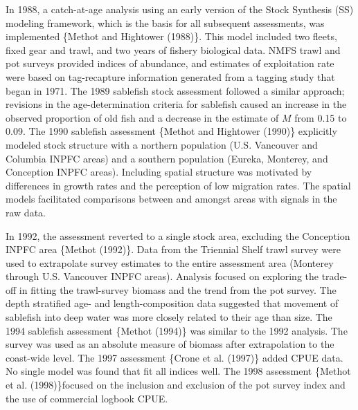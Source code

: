 \documentclass[11pt,
  english,
  a4paper,
]{article}
\begin{document}

In 1988, a catch-at-age analysis using an early version of the Stock Synthesis (SS) modeling framework, which is the basis for all subsequent assessments, was implemented \{{Methot and Hightower (1988)\leavevmode\tagmcend\tagstructend}\}. This model included two fleets, fixed gear and trawl, and two years of fishery biological data. NMFS trawl and pot surveys provided indices of abundance, and estimates of exploitation rate were based on tag-recapture information generated from a tagging study that began in 1971. The 1989 sablefish stock assessment followed a similar approach; revisions in the age-determination criteria for sablefish caused an increase in the observed proportion of old fish and a decrease in the estimate of {\(M\)\leavevmode\tagmcend\tagstructend} from 0.15 to 0.09. The 1990 sablefish assessment \{{Methot and Hightower (1990)\leavevmode\tagmcend\tagstructend}\} explicitly modeled stock structure with a northern population (U.S. Vancouver and Columbia INPFC areas) and a southern population (Eureka, Monterey, and Conception INPFC areas). Including spatial structure was motivated by differences in growth rates and the perception of low migration rates. The spatial models facilitated comparisons between and amongst areas with signals in the raw data.

\leavevmode\tagmcend\tagstructend\par


In 1992, the assessment reverted to a single stock area, excluding the Conception INPFC area \{{Methot (1992)\leavevmode\tagmcend\tagstructend}\}. Data from the Triennial Shelf trawl survey were used to extrapolate survey estimates to the entire assessment area (Monterey through U.S. Vancouver INPFC areas). Analysis focused on exploring the trade-off in fitting the trawl-survey biomass and the trend from the pot survey. The depth stratified age- and length-composition data suggested that movement of sablefish into deep water was more closely related to their age than size. The 1994 sablefish assessment \{{Methot (1994)\leavevmode\tagmcend\tagstructend}\} was similar to the 1992 analysis. The survey was used as an absolute measure of biomass after extrapolation to the coast-wide level. The 1997 assessment \{{Crone et al. (1997)\leavevmode\tagmcend\tagstructend}\} added CPUE data. No single model was found that fit all indices well. The 1998 assessment \{{Methot et al. (1998)\leavevmode\tagmcend\tagstructend}\}focused on the inclusion and exclusion of the pot survey index and the use of commercial logbook CPUE.
\end{document}
